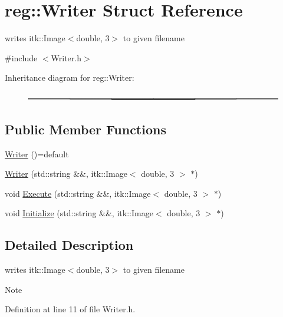 \hypertarget{structreg_1_1_writer}{}\section{reg\+:\+:Writer Struct Reference}
\label{structreg_1_1_writer}


writes itk\+::\+Image$<$double, 3$>$ to given filename  




{\ttfamily \#include $<$Writer.\+h$>$}

Inheritance diagram for reg\+:\+:Writer\+:\begin{figure}[H]
\begin{center}
\leavevmode
\includegraphics[height=0.135331cm]{structreg_1_1_writer}
\end{center}
\end{figure}
\subsection*{Public Member Functions}
\begin{DoxyCompactItemize}
\item 
\hyperlink{structreg_1_1_writer_af4772fac6913708ed8ad4292a908ef7f}{Writer} ()=default
\item 
\hyperlink{structreg_1_1_writer_afbce1fdc6153a79d9affc3c3c0b8b28c}{Writer} (std\+::string \&\&, itk\+::\+Image$<$ double, 3 $>$ $\ast$)
\item 
void \hyperlink{structreg_1_1_writer_abc483635c322211e5e0e8789e4a21a1c}{Execute} (std\+::string \&\&, itk\+::\+Image$<$ double, 3 $>$ $\ast$)
\item 
void \hyperlink{structreg_1_1_writer_af64428b12094aa95d2ee441e6150d409}{Initialize} (std\+::string \&\&, itk\+::\+Image$<$ double, 3 $>$ $\ast$)
\end{DoxyCompactItemize}


\subsection{Detailed Description}
writes itk\+::\+Image$<$double, 3$>$ to given filename 

\begin{DoxyNote}{Note}

\end{DoxyNote}


Definition at line 11 of file Writer.\+h.



